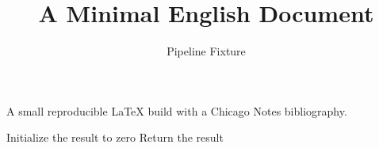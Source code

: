 \documentclass{article}
\title{A Minimal English Document}
\author{Pipeline Fixture}
\begin{document}
\maketitle
A small reproducible LaTeX build with a Chicago Notes bibliography\cite{sample}.

\begin{algorithm}
\caption{A minimal algorithm}
\begin{algorithmic}
\State Initialize the result to zero
\State Return the result
\end{algorithmic}
\end{algorithm}

\printbibliography
\end{document}
